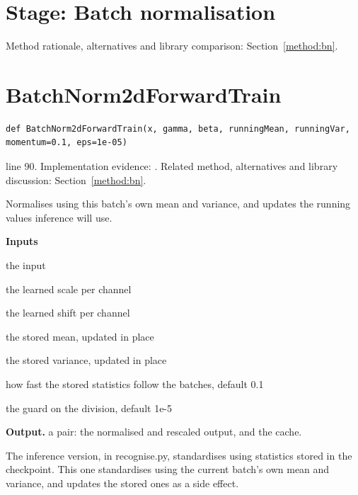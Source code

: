 \section*{Stage: Batch normalisation}
Method rationale, alternatives and library comparison: Section~\ref{method:bn}.
\section{BatchNorm2dForwardTrain}\label{fn:train:BatchNorm2dForwardTrain}
\begin{lstlisting}[style=sig]
def BatchNorm2dForwardTrain(x, gamma, beta, runningMean, runningVar, momentum=0.1, eps=1e-05)
\end{lstlisting}
 line 90. Implementation evidence: \cite{code2026}. Related method, alternatives and library discussion: Section~\ref{method:bn}.


Normalises using this batch's own mean and variance, and updates the running values inference will use.




\noindent\textbf{Inputs}
\begin{description}[leftmargin=2.2em,style=nextline,font=\normalfont\ttfamily]\setlength\itemsep{1pt}
  \item[{x}] \normalfont the input
  \item[{gamma}] \normalfont the learned scale per channel
  \item[{beta}] \normalfont the learned shift per channel
  \item[{runningMean}] \normalfont the stored mean, updated in place
  \item[{runningVar}] \normalfont the stored variance, updated in place
  \item[{momentum}] \normalfont how fast the stored statistics follow the batches, default 0.1
  \item[{eps}] \normalfont the guard on the division, default 1e-5
\end{description}

\noindent\textbf{Output.} a pair: the normalised and rescaled output, and the cache.


The inference version, in recognise.py, standardises using statistics stored in the checkpoint. This one standardises using the current batch's own mean and variance, and updates the stored ones as a side effect.



